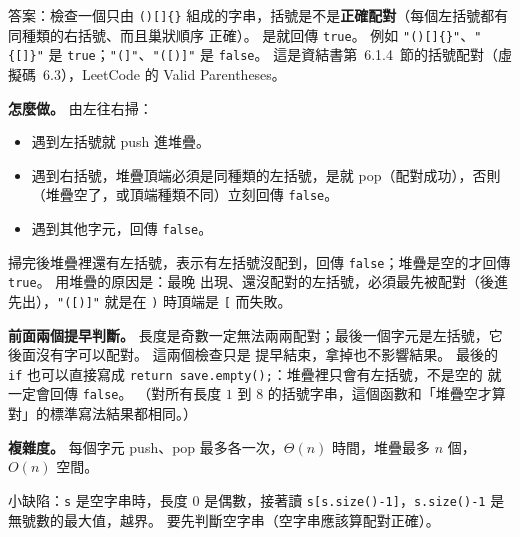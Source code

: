 \begin{pastsoln}
答案：檢查一個只由 \texttt{()[]\{\}} 組成的字串，括號是不是\textbf{正確配對}（每個左括號都有同種類的右括號、而且巢狀順序
正確）。 是就回傳 \texttt{true}。 例如 \texttt{"()[]\{\}"}、\texttt{"\{[]\}"} 是 \texttt{true}；\texttt{"(]"}、\texttt{"([)]"} 是
\texttt{false}。 這是資結書第~6.1.4~節的括號配對（虛擬碼~6.3），LeetCode 的 Valid Parentheses。

\textbf{怎麼做。} 由左往右掃：
\begin{itemize}
\item 遇到左括號就 push 進堆疊。
\item 遇到右括號，堆疊頂端必須是同種類的左括號，是就 pop（配對成功），否則（堆疊空了，或頂端種類不同）立刻回傳
\texttt{false}。
\item 遇到其他字元，回傳 \texttt{false}。
\end{itemize}
掃完後堆疊裡還有左括號，表示有左括號沒配到，回傳 \texttt{false}；堆疊是空的才回傳 \texttt{true}。 用堆疊的原因是：最晚
出現、還沒配對的左括號，必須最先被配對（後進先出），\texttt{"([)]"} 就是在 \texttt{)} 時頂端是 \texttt{[} 而失敗。

\textbf{前面兩個提早判斷。} 長度是奇數一定無法兩兩配對；最後一個字元是左括號，它後面沒有字可以配對。 這兩個檢查只是
提早結束，拿掉也不影響結果。 最後的 \texttt{if} 也可以直接寫成 \texttt{return save.empty();}：堆疊裡只會有左括號，不是空的
就一定會回傳 \texttt{false}。 （對所有長度 $1$ 到 $8$ 的括號字串，這個函數和「堆疊空才算對」的標準寫法結果都相同。）

\textbf{複雜度。} 每個字元 push、pop 最多各一次，$\Theta(n)$ 時間，堆疊最多 $n$ 個，$O(n)$ 空間。

小缺陷：\texttt{s} 是空字串時，長度 $0$ 是偶數，接著讀 \texttt{s[s.size()-1]}，\texttt{s.size()-1} 是無號數的最大值，越界。
要先判斷空字串（空字串應該算配對正確）。
\end{pastsoln}
